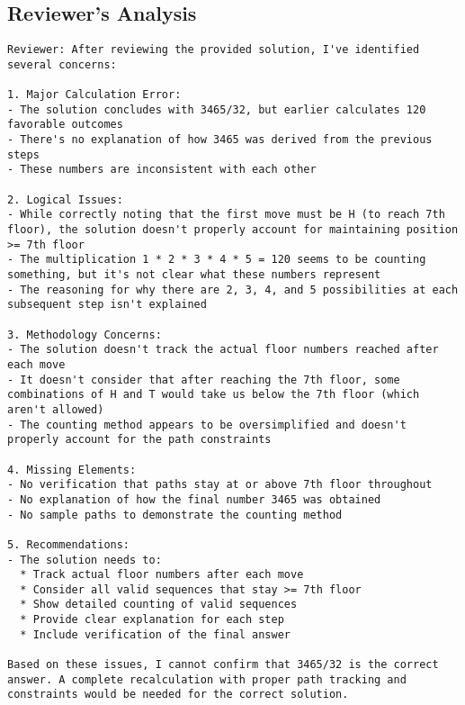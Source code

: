 \subsection{Reviewer's Analysis}
\vspace{-0.5em}
\begin{reviewerbox}
\begin{lstlisting}
Reviewer: After reviewing the provided solution, I've identified several concerns:

1. Major Calculation Error:
- The solution concludes with 3465/32, but earlier calculates 120 favorable outcomes
- There's no explanation of how 3465 was derived from the previous steps
- These numbers are inconsistent with each other

2. Logical Issues:
- While correctly noting that the first move must be H (to reach 7th floor), the solution doesn't properly account for maintaining position >= 7th floor
- The multiplication 1 * 2 * 3 * 4 * 5 = 120 seems to be counting something, but it's not clear what these numbers represent
- The reasoning for why there are 2, 3, 4, and 5 possibilities at each subsequent step isn't explained

3. Methodology Concerns:
- The solution doesn't track the actual floor numbers reached after each move
- It doesn't consider that after reaching the 7th floor, some combinations of H and T would take us below the 7th floor (which aren't allowed)
- The counting method appears to be oversimplified and doesn't properly account for the path constraints

4. Missing Elements:
- No verification that paths stay at or above 7th floor throughout
- No explanation of how the final number 3465 was obtained
- No sample paths to demonstrate the counting method

5. Recommendations:
- The solution needs to:
  * Track actual floor numbers after each move
  * Consider all valid sequences that stay >= 7th floor
  * Show detailed counting of valid sequences
  * Provide clear explanation for each step
  * Include verification of the final answer

Based on these issues, I cannot confirm that 3465/32 is the correct answer. A complete recalculation with proper path tracking and constraints would be needed for the correct solution.

\end{lstlisting}
\end{reviewerbox}

